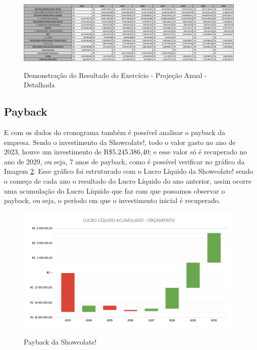 \documentclass[
	12pt,				%
	openright,			%
	oneside,			%
	a4paper,			%
	english,			%
	french,				%
	spanish,			%
	brazil				%
	]{abntex2}
\begin{document}
\begin{landscape}

\begin{figure}[]
\begin{center}
\caption{Demonstração do Resultado do Exercício - Projeção Anual - Detalhada}
\includegraphics[scale=0.55]{a9.jpeg} 
\label{cro}
\end{center}
\end{figure}

\end{landscape}

\subsection{Payback}

E com os dados do cronograma também é possível analisar o payback da empresa. Sendo o investimento da Showcolate!, todo o valor gasto no ano de 2023, houve um investimento de R\$5.245.386,40; e esse valor só é recuperado no ano de 2029, ou seja, 7 anos de payback, como é possível verificar no gráfico da Imagem \ref{pay}. Esse gráfico foi estruturado com o Lucro Líquido da Showcolate! sendo o começo de cada ano o resultado do Lucro Líquido do ano anterior, assim ocorre uma acumulação do Lucro Líquido que faz com que possamos observar o payback, ou seja, o período em que o investimento inicial é recuperado.

\begin{figure}[H]
\begin{center}
\caption{Payback da Showcolate!}
\includegraphics[scale=0.28]{a12.png} 
\label{pay}
\end{center}
\end{figure}
\end{document}
